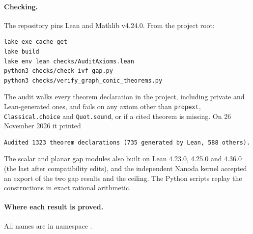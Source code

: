 \documentclass[11pt]{article}
\theoremstyle{definition}
\theoremstyle{remark}
\begin{document}
\paragraph{Checking.} The repository pins Lean and Mathlib v4.24.0. From the project root:
\begin{verbatim}
lake exe cache get
lake build
lake env lean checks/AuditAxioms.lean
python3 checks/check_ivf_gap.py
python3 checks/verify_graph_conic_theorems.py
\end{verbatim}
The audit walks every theorem declaration in the project, including private and Lean-generated ones, and fails on any axiom other than \texttt{propext}, \texttt{Classical.choice} and \texttt{Quot.sound}, or if a cited theorem is missing. On 26 November 2026 it printed
\begin{verbatim}
Audited 1323 theorem declarations (735 generated by Lean, 588 others).
\end{verbatim}
The scalar and planar gap modules also built on Lean 4.23.0, 4.25.0 and 4.36.0 (the last after compatibility edits), and the independent Nanoda kernel accepted an export of the two gap results and the ceiling. The Python scripts replay the constructions in exact rational arithmetic.

\paragraph{Where each result is proved.} All names are in namespace .
\end{document}
